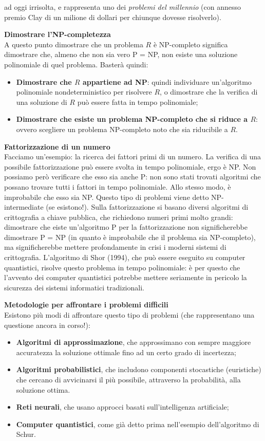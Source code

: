 \documentclass[a4paper,12pt]{article}
\begin{document}
ad oggi irrisolta, e rappresenta uno dei \textit{problemi del millennio} (con annesso premio Clay di un milione di dollari per chiunque dovesse risolverlo).
\par\smallskip
\textbf{Dimostrare l'NP-completezza} \\
A questo punto dimostrare che un problema $R$ è NP-completo significa dimostrare che, almeno che non sia vero P = NP, non esiste una soluzione
polinomiale di quel problema. Basterà quindi:
\begin{itemize}
  \item \textbf{Dimostrare che $R$ appartiene ad NP}: quindi individuare un'algoritmo polinomiale nondeterministico
    per risolvere $R$, o dimostrare che la verifica di una soluzione di $R$ può essere fatta in tempo polinomiale;
  \item \textbf{Dimostrare che esiste un problema NP-completo che si riduce a $R$}: ovvero scegliere un problema NP-completo noto
    che sia riducibile a $R$.
\end{itemize}
\par\smallskip
\textbf{Fattorizzazione di un numero} \\
Facciamo un'esempio: la ricerca dei fattori primi di un numero. La verifica di una possibile fattorizzazione
può essere svolta in tempo polinomiale, ergo è NP. Non possiamo però verificare che esso sia anche P: non sono stati trovati
algoritmi che possano trovare tutti i fattori in tempo polinomiale. Allo stesso modo, è improbabile che esso sia NP. Questo tipo di problemi
viene detto NP-intermediate (se esistono!). Sulla fattorizzazione si basano diversi algoritmi di crittografia a chiave pubblica, che richiedono
numeri primi molto grandi: dimostrare che eiste un'algoritmo P per la fattorizzazione non significherebbe dimostrare P = NP (in quanto è improbabile che il problema sia NP-completo),
ma significherebbe mettere profondamente in crisi i moderni sistemi di crittografia. L'algoritmo di Shor (1994), che può essere eseguito su computer quantistici, risolve questo problema
in tempo polinomiale: è per questo che l'avvento dei computer quantistici potrebbe mettere seriamente in pericolo la sicurezza dei sistemi informatici tradizionali.
\par\smallskip
\textbf{Metodologie per affrontare i problemi difficili} \\
Esistono più modi di affrontare questo tipo di problemi (che rappresentano una questione ancora in corso!):
\begin{itemize}
  \item \textbf{Algoritmi di approssimazione}, che approssimano con sempre maggiore accuratezza la soluzione ottimale fino ad un certo
    grado di incertezza;
  \item \textbf{Algoritmi probabilistici}, che includono componenti stocastiche (euristiche) che cercano di avvicinarsi il più
    possibile, attraverso la probabilità, alla soluzione ottima.
  \item \textbf{Reti neurali}, che usano approcci basati sull'intelligenza artificiale;
  \item \textbf{Computer quantistici}, come già detto prima nell'esempio dell'algoritmo di Schur.
\end{itemize}
\end{document}
